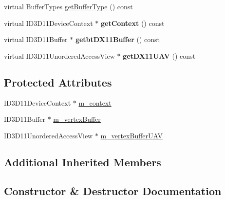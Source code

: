 \begin{DoxyCompactItemize}
\item 
virtual Buffer\+Types \hyperlink{classbtDX11VertexBufferDescriptor_aaa92499e7319fda25f7cd787b14c4933}{get\+Buffer\+Type} () const
\item 
\mbox{\label{classbtDX11VertexBufferDescriptor_a3c99b743df080a7c5e0a58aaaaffc3e6}} 
virtual I\+D3\+D11\+Device\+Context $\ast$ {\bfseries get\+Context} () const
\item 
\mbox{\label{classbtDX11VertexBufferDescriptor_ac059d92caa0dfb2cfae17f648e40e492}} 
virtual I\+D3\+D11\+Buffer $\ast$ {\bfseries getbt\+D\+X11\+Buffer} () const
\item 
\mbox{\label{classbtDX11VertexBufferDescriptor_a1cc8a36072951fc6b7c45e7329916308}} 
virtual I\+D3\+D11\+Unordered\+Access\+View $\ast$ {\bfseries get\+D\+X11\+U\+AV} () const
\end{DoxyCompactItemize}
\subsection*{Protected Attributes}
\begin{DoxyCompactItemize}
\item 
I\+D3\+D11\+Device\+Context $\ast$ \hyperlink{classbtDX11VertexBufferDescriptor_ad574be692b3fea8a0af8287ac7b8cb38}{m\+\_\+context}
\item 
I\+D3\+D11\+Buffer $\ast$ \hyperlink{classbtDX11VertexBufferDescriptor_adbb051cf68333a8409967bc638e4b322}{m\+\_\+vertex\+Buffer}
\item 
I\+D3\+D11\+Unordered\+Access\+View $\ast$ \hyperlink{classbtDX11VertexBufferDescriptor_a2f800339315be90e94c872625f5a68c1}{m\+\_\+vertex\+Buffer\+U\+AV}
\end{DoxyCompactItemize}
\subsection*{Additional Inherited Members}


\subsection{Constructor \& Destructor Documentation}
\mbox{\label{classbtDX11VertexBufferDescriptor_af395186594c4954fb48971cd7e1eb2b8}} 
